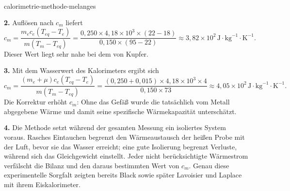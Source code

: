 \begin{exo}{calorimetrie-methode-melanges}
\begin{solution}
\textbf{2.} Auflösen nach $c_m$ liefert
\[
c_m=\frac{m_ec_e(T_{eq}-T_e)}{m(T_m-T_{eq})}
=\frac{0{,}250\times4{,}18\times10^3\times(22-18)}{0{,}150\times(95-22)}
\approx3{,}82\times10^2\,\text{J}\!\cdot\!\text{kg}^{-1}\!\cdot\!\text{K}^{-1}.
\]
Dieser Wert liegt sehr nahe bei dem von Kupfer.

\textbf{3.} Mit dem Wasserwert des Kalorimeters ergibt sich
\[
c_m=\frac{(m_e+\mu)c_e(T_{eq}-T_e)}{m(T_m-T_{eq})}
=\frac{(0{,}250+0{,}015)\times4{,}18\times10^3\times4}{0{,}150\times73}
\approx4{,}05\times10^2\,\text{J}\!\cdot\!\text{kg}^{-1}\!\cdot\!\text{K}^{-1}.
\]
Die Korrektur erhöht $c_m$: Ohne das Gefäß wurde die tatsächlich vom Metall abgegebene Wärme und damit seine spezifische Wärmekapazität unterschätzt.

\textbf{4.} Die Methode setzt während der gesamten Messung ein isoliertes System voraus. Rasches Eintauchen begrenzt den Wärmeaustausch der heißen Probe mit der Luft, bevor sie das Wasser erreicht; eine gute Isolierung begrenzt Verluste, während sich das Gleichgewicht einstellt. Jeder nicht berücksichtigte Wärmestrom verfälscht die Bilanz und den daraus bestimmten Wert von $c_m$. Genau diese experimentelle Sorgfalt zeigten bereits Black sowie später Lavoisier und Laplace mit ihrem Eiskalorimeter.
\end{solution}
\end{exo}

